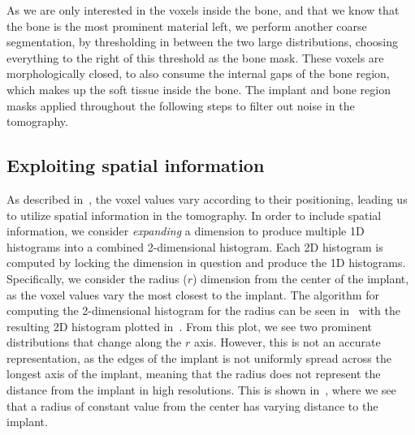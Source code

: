 As we are only interested in the voxels inside the bone, and that we know that the bone is the most prominent material left, we perform another coarse segmentation, by thresholding in between the two large distributions, choosing everything to the right of this threshold as the bone mask. These voxels are morphologically closed, to also consume the internal gaps of the bone region, which makes up the soft tissue inside the bone. The implant and bone region masks applied throughout the following steps to filter out noise in the tomography.

\subsection{Exploiting spatial information}
As described in~, the voxel values vary according to their positioning, leading us to utilize spatial information in the tomography. 
In order to include spatial information, we consider \textit{expanding} a dimension to produce multiple 1D histograms into a combined 2-dimensional histogram.
Each 2D histogram is computed by locking the dimension in question and produce the 1D histograms.
Specifically, we consider the radius ($r$) dimension from the center of the implant, as the voxel values vary the most closest to the implant. 
The algorithm for computing the 2-dimensional histogram for the radius can be seen in~ with the resulting 2D histogram plotted in~.
From this plot, we see two prominent distributions that change along the $r$ axis.
However, this is not an accurate representation, as the edges of the implant is not uniformly spread across the longest axis of the implant, meaning that the radius does not represent the distance from the implant in high resolutions. This is shown in~, where we see that a radius of constant value from the center has varying distance to the implant.



